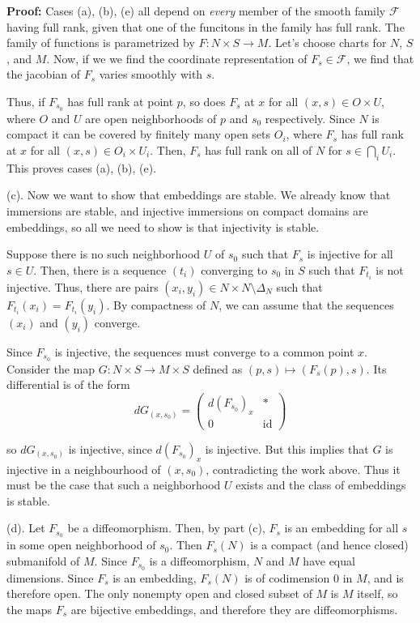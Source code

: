 \documentclass{article}
\begin{document}
\vskip 0.5cm
\textbf{Proof:}
Cases (a), (b), (e) all depend on \emph{every} member of the smooth family $\mathcal{F}$ having full rank, given that one of the funcitons in the family has full rank. The family of functions is parametrized by $F : N \times S \rightarrow M$. Let's choose charts for $N$, $S$, and $M$. Now, if we we find the coordinate representation of $F_s \in \mathcal{F}$, we find that the jacobian of $F_s$ varies smoothly with $s$.

\vskip 0.25cm
Thus, if $F_{{s_0}}$ has full rank at point $p$, so does $F_s$ at $x$ for all $(x, s) \in O \times U$, where $O$ and $U$ are open neighborhoods of $p$ and $s_0$ respectively. Since $N$ is compact it can be covered by finitely many open sets $O_i$, where $F_s$ has full rank at $x$ for all $(x, s) \in O_i \times U_i$. Then, $F_s$ has full rank on all of $N$ for $s \in \bigcap_{i} U_i$. This proves cases (a), (b), (e).


\vskip 1cm
(c). Now we want to show that embeddings are stable. We already know that immersions are stable, and injective immersions on compact domains are embeddings, so all we need to show is that injectivity is stable.

\vskip 0.25cm
Suppose there is no such neighborhood $U$ of $s_0$ such that $F_s$ is injective for all $s \in U$. Then, there is a sequence $(t_i)$ converging to $s_0$ in $S$ such that $F_{t_i}$ is not injective. Thus, there are pairs $(x_i, y_i) \in N \times N \setminus \Delta_N$ such that $F_{{t_i}}(x_i) = F_{{t_i}}(y_i)$. By compactness of $N$, we can assume that the sequences $(x_i)$ and $(y_i)$ converge. 

\vskip 0.25cm
Since $F_{{s_0}}$ is injective, the sequences must converge to a common point $x$. Consider the map $G : N \times S \rightarrow M \times S$ defined as $(p,s) \mapsto (F_s(p), s)$. Its differential is of the form 
\[ dG_{(x, s_0)} = \begin{pmatrix}
  d\left(F_{s_0}\right)_x & * \\
  0 & \mathrm{id}
\end{pmatrix} \]

so $dG_{(x, s_0)}$ is injective, since $d\left( F_{s_0} \right)_x$ is injective. But this implies that $G$ is injective in a neighbourhood of $(x, s_0)$, contradicting the work above. Thus it must be the case that such a neighborhood $U$ exists and the class of embeddings is stable.

\vskip 1cm
(d). Let $F_{s_0}$ be a diffeomorphism. Then, by part (c), $F_s$ is an embedding for all $s$ in some open neighborhood of $s_0$. Then $F_s(N)$ is a compact (and hence closed) submanifold of $M$. Since $F_{s_0}$ is a diffeomorphism, $N$ and $M$ have equal dimensions. Since $F_s$ is an embedding, $F_s(N)$ is of codimension $0$ in $M$, and is therefore open. The only nonempty open and closed subset of $M$ is $M$ itself, so the maps $F_s$ are bijective embeddings, and therefore they are diffeomorphisms.
\end{document}
